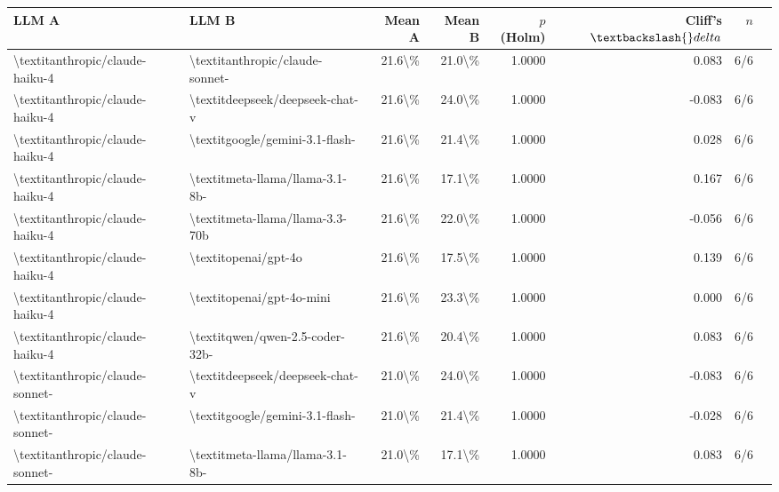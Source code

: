 \begin{table}[htbp]
\centering
{\small
\begin{tabular}{ll|rrrrrl}
\toprule
\textbf{LLM A} & \textbf{LLM B} & \textbf{Mean A} & \textbf{Mean B} & \textbf{$p$ (Holm)} & \textbf{Cliff's $\textbackslash{}delta$} & \textbf{$n$} \\
\midrule
\textbackslash{}textit{anthropic/claude-haiku-4} & \textbackslash{}textit{anthropic/claude-sonnet-} & 21.6\textbackslash{}\% & 21.0\textbackslash{}\% & 1.0000 & 0.083 & 6/6 \\
\textbackslash{}textit{anthropic/claude-haiku-4} & \textbackslash{}textit{deepseek/deepseek-chat-v} & 21.6\textbackslash{}\% & 24.0\textbackslash{}\% & 1.0000 & -0.083 & 6/6 \\
\textbackslash{}textit{anthropic/claude-haiku-4} & \textbackslash{}textit{google/gemini-3.1-flash-} & 21.6\textbackslash{}\% & 21.4\textbackslash{}\% & 1.0000 & 0.028 & 6/6 \\
\textbackslash{}textit{anthropic/claude-haiku-4} & \textbackslash{}textit{meta-llama/llama-3.1-8b-} & 21.6\textbackslash{}\% & 17.1\textbackslash{}\% & 1.0000 & 0.167 & 6/6 \\
\textbackslash{}textit{anthropic/claude-haiku-4} & \textbackslash{}textit{meta-llama/llama-3.3-70b} & 21.6\textbackslash{}\% & 22.0\textbackslash{}\% & 1.0000 & -0.056 & 6/6 \\
\textbackslash{}textit{anthropic/claude-haiku-4} & \textbackslash{}textit{openai/gpt-4o} & 21.6\textbackslash{}\% & 17.5\textbackslash{}\% & 1.0000 & 0.139 & 6/6 \\
\textbackslash{}textit{anthropic/claude-haiku-4} & \textbackslash{}textit{openai/gpt-4o-mini} & 21.6\textbackslash{}\% & 23.3\textbackslash{}\% & 1.0000 & 0.000 & 6/6 \\
\textbackslash{}textit{anthropic/claude-haiku-4} & \textbackslash{}textit{qwen/qwen-2.5-coder-32b-} & 21.6\textbackslash{}\% & 20.4\textbackslash{}\% & 1.0000 & 0.083 & 6/6 \\
\textbackslash{}textit{anthropic/claude-sonnet-} & \textbackslash{}textit{deepseek/deepseek-chat-v} & 21.0\textbackslash{}\% & 24.0\textbackslash{}\% & 1.0000 & -0.083 & 6/6 \\
\textbackslash{}textit{anthropic/claude-sonnet-} & \textbackslash{}textit{google/gemini-3.1-flash-} & 21.0\textbackslash{}\% & 21.4\textbackslash{}\% & 1.0000 & -0.028 & 6/6 \\
\textbackslash{}textit{anthropic/claude-sonnet-} & \textbackslash{}textit{meta-llama/llama-3.1-8b-} & 21.0\textbackslash{}\% & 17.1\textbackslash{}\% & 1.0000 & 0.083 & 6/6 \\

\end{tabular}}
\end{table}
